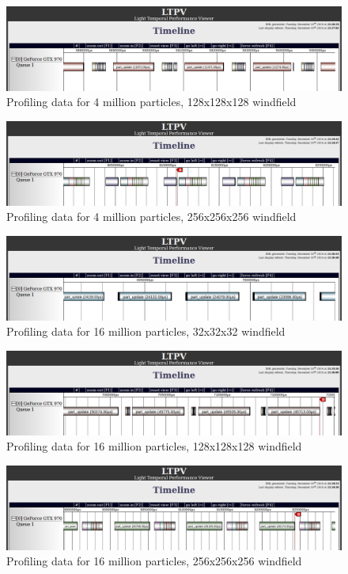 \begin{figure}[ht!]
\centering
\includegraphics[width=\textwidth]{fig/profiling/4m_128}
\caption{Profiling data for 4 million particles, 128x128x128 windfield}
\label{fig:4m_128}
\end{figure}

\begin{figure}[ht!]
\centering
\includegraphics[width=\textwidth]{fig/profiling/4m_256}
\caption{Profiling data for 4 million particles, 256x256x256 windfield}
\label{fig:4m_256}
\end{figure}

\begin{figure}[ht!]
\centering
\includegraphics[width=\textwidth]{fig/profiling/16m_32}
\caption{Profiling data for 16 million particles, 32x32x32 windfield}
\label{fig:16m_32}
\end{figure}

\begin{figure}[ht!]
\centering
\includegraphics[width=\textwidth]{fig/profiling/16m_128}
\caption{Profiling data for 16 million particles, 128x128x128 windfield}
\label{fig:16m_128}
\end{figure}

\begin{figure}[ht!]
\centering
\includegraphics[width=\textwidth]{fig/profiling/16m_256}
\caption{Profiling data for 16 million particles, 256x256x256 windfield}
\label{fig:16m_256}
\end{figure}